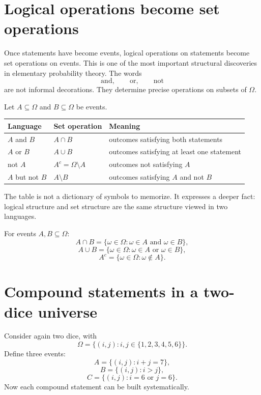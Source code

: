 \section{Logical operations become set operations}

Once statements have become events, logical operations on statements become set operations on events. This is one of the most important structural discoveries in elementary probability theory. The words
\[
\text{and},\qquad \text{or},\qquad \text{not}
\]
are not informal decorations. They determine precise operations on subsets of \(\Omega\).

Let \(A\subseteq\Omega\) and \(B\subseteq\Omega\) be events.

\begin{center}
\begin{tabular}{lll}
\toprule
Language & Set operation & Meaning \\
\midrule
\(A\) and \(B\) & \(A\cap B\) & outcomes satisfying both statements \\
\(A\) or \(B\) & \(A\cup B\) & outcomes satisfying at least one statement \\
not \(A\) & \(A^c=\Omega\setminus A\) & outcomes not satisfying \(A\) \\
\(A\) but not \(B\) & \(A\setminus B\) & outcomes satisfying \(A\) and not \(B\) \\
\bottomrule
\end{tabular}
\end{center}

The table is not a dictionary of symbols to memorize. It expresses a deeper fact: logical structure and set structure are the same structure viewed in two languages.

\begin{definitionbox}
For events \(A,B\subseteq\Omega\):
\[
A\cap B=\{\omega\in\Omega:\omega\in A\text{ and }\omega\in B\},
\]
\[
A\cup B=\{\omega\in\Omega:\omega\in A\text{ or }\omega\in B\},
\]
\[
A^c=\{\omega\in\Omega:\omega\notin A\}.
\]
\end{definitionbox}

\section{Compound statements in a two-dice universe}

Consider again two dice, with
\[
\Omega=\{(i,j):i,j\in\{1,2,3,4,5,6\}\}.
\]
Define three events:
\[
A=\{(i,j):i+j=7\},
\]
\[
B=\{(i,j):i>j\},
\]
\[
C=\{(i,j):i=6\text{ or }j=6\}.
\]
Now each compound statement can be built systematically.

